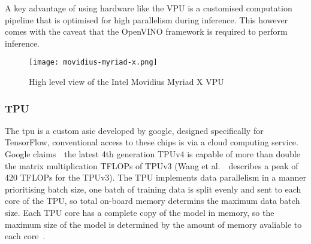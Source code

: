 \documentclass[../../D1.tex]{subfiles}
\begin{document}
A key advantage of using hardware like the VPU is a customised computation pipeline that is optimised for high parallelism during inference. This however comes with the caveat that the OpenVINO framework is required to perform inference\autocite{antoniniResourceCharacterisationPersonalScale2019}.

\begin{figure}
    \texttt{[image: movidius-myriad-x.png]}
    \caption{High level view of the Intel Movidius Myriad X VPU}
    \label{fig:MyriadX}
\end{figure}

\subsubsection{TPU}
The \acrshort{tpu} is a custom \acrshort{asic} developed by google, designed specifically for TensorFlow, conventional access to these chips is via a cloud computing service. 
Google claims~\autocite{GoogleWinsMLPerf}~the latest 4th generation TPUv4 is capable of more than double the matrix multiplication TFLOPs of TPUv3 (Wang et al.~\autocite{wangBenchmarkingTPUGPU2019}~describes a peak of 420 TFLOPs for the TPUv3).
The TPU implements data parallelism in a manner prioritising batch size, one batch of training data is split evenly and sent to each core of the TPU, so total on-board memory determins the maximum data batch size.
Each TPU core has a complete copy of the model in memory, so the maximum size of the model is determined by the amount of memory avaliable to each core~\autocite{wangBenchmarkingTPUGPU2019}.
\end{document}
